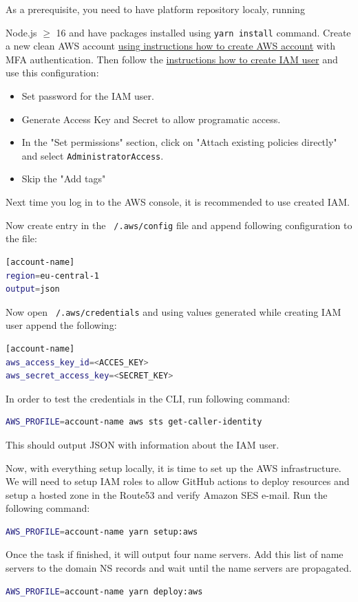 As a prerequisite, you need to have platform repository localy, running {Node.js $\geq$ 16 and have packages installed using \texttt{yarn install} command. 
Create a new clean AWS account \href{https://repost.aws/knowledge-center/create-and-activate-aws-account}{using instructions how to create AWS account} with MFA authentication.
Then follow the \href{https://docs.aws.amazon.com/IAM/latest/UserGuide/id_users_create.html}{instructions how to create IAM user} and use this configuration:
\begin{itemize}
    \item Set password for the IAM user.
    \item Generate Access Key and Secret to allow programatic access.
    \item In the "Set permissions" section, click on "Attach existing policies directly" and select \texttt{AdministratorAccess}.
    \item Skip the "Add tags"
\end{itemize}
Next time you log in to the AWS console, it is recommended to use created IAM.

Now create entry in the \texttt{~/.aws/config} file and append following configuration to the file:
\begin{lstlisting}[language=bash,caption={\texttt{~/.aws/config}}]
[account-name]
region=eu-central-1
output=json
\end{lstlisting}

Now open \texttt{~/.aws/credentials} and using values generated while creating IAM user append the following:
\begin{lstlisting}[language=bash,caption={\texttt{~/.aws/credentials}}]
[account-name]
aws_access_key_id=<ACCES_KEY>
aws_secret_access_key=<SECRET_KEY>
\end{lstlisting}
In order to test the credentials in the CLI, run following command:
\begin{lstlisting}[language=bash,caption={Command to test AWS identity}]
AWS_PROFILE=account-name aws sts get-caller-identity
\end{lstlisting}
This should output JSON with information about the IAM user.

Now, with everything setup locally, it is time to set up the AWS infrastructure.
We will need to setup IAM roles to allow GitHub actions to deploy resources and setup a hosted zone in the Route53 and verify Amazon SES e-mail.
Run the following command:
\begin{lstlisting}[language=bash,caption={Command to setup AWS infrastructure}]
AWS_PROFILE=account-name yarn setup:aws
\end{lstlisting}
Once the task if finished, it will output four name servers.
Add this list of name servers to the domain NS records and wait until the name servers are propagated.
\begin{lstlisting}[language=bash,caption={Command to deploy to the AWS}]
AWS_PROFILE=account-name yarn deploy:aws
\end{lstlisting}

}
